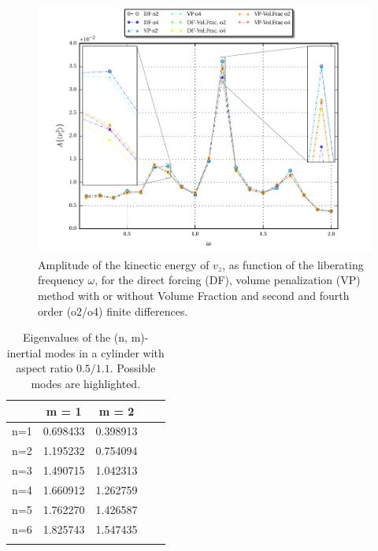 \clearpage

\begin{figure}[!t]
  \centering
  \includegraphics{gfx/cone/cylinder/cylinder.pdf}  \caption{\label{fig:cone:cyl}
    Amplitude of the kinectic energy of $v_z$, as function of the liberating frequency $\omega$,
   for the direct forcing (DF), volume penalization (VP) method with or without Volume Fraction and
      second and fourth order (o2/o4) finite differences.}
\end{figure}

\bgroup\large
\begin{table}[!b]
\centering
\def\arraystretch{1.5}%
\begin{tabular}{c c c c c}\toprule
            &    m =  1  & m = 2   &    \\ \hline
\midrule
        n=1 &   0.698433         &              0.398913 &    \\
        n=2 & \cellcolor{blue!25}  1.195232         &        \cellcolor{blue!25}      0.754094 &    \\
        n=3 &   1.490715         &              1.042313 &    \\
        n=4 &  \cellcolor{blue!25} 1.660912         &     \cellcolor{blue!25}         1.262759 &    \\
        n=5 &   1.762270         &              1.426587 &    \\
        n=6 &   1.825743         &              1.547435 &    \\ \hline

\bottomrule
\label{cone_cyleigenvalues}
\end{tabular}
\caption{Eigenvalues of the (n, m)-inertial modes in  a cylinder with aspect ratio $0.5/1.1$.
            Possible modes are highlighted.}
\end{table}
\egroup
\clearpage

